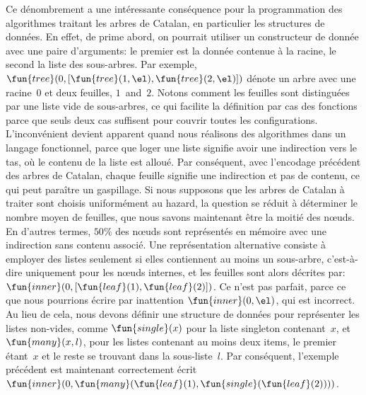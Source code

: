 Ce dénombrement a une intéressante conséquence pour la programmation
des algorithmes traitant les arbres de Catalan, en particulier les
structures de données. En effet, de prime abord, on pourrait utiliser
un constructeur de donnée  avec une paire d'arguments: le
premier est la donnée contenue à la racine, le second la liste des
sous-arbres. Par exemple, \(\fun{tree}(0,[\fun{tree}(1,\el),
  \fun{tree}(2,\el)])\) dénote un arbre avec une racine~\(0\) et deux
feuilles, \(1\)~and~\(2\). Notons comment les feuilles sont
distinguées par une liste vide de sous-arbres, ce qui facilite la
définition par cas des fonctions parce que seuls deux cas suffisent
pour couvrir toutes les configurations. L'inconvénient devient
apparent quand nous réalisons des algorithmes dans un langage
fonctionnel, parce que loger une liste signifie avoir une indirection
vers le tas, où le contenu de la liste est alloué. Par conséquent,
avec l'encodage précédent des arbres de Catalan, chaque feuille
signifie une indirection et pas de contenu, ce qui peut paraître un
gaspillage. Si nous supposons que les arbres de Catalan à traiter sont
choisis uniformément au hazard, la question se réduit à déterminer le
nombre moyen de feuilles, que nous savons maintenant être la moitié
des nœuds. En d'autres termes, \(50\%\) des nœuds sont représentés en
mémoire avec une indirection sans contenu associé. Une représentation
alternative consiste à employer des listes seulement si elles
contiennent au moins un sous-arbre, c'est-à-dire uniquement pour les
nœuds internes, et les feuilles sont alors décrites par:
\(\fun{inner}(0,[\fun{leaf}(1),\fun{leaf}(2)])\). Ce n'est pas
parfait, parce ce que nous pourrions écrire par inattention
\(\fun{inner}(0,\el)\), qui est incorrect. Au lieu de cela, nous
devons définir une structure de données pour représenter les listes
non-vides, comme \(\fun{single}(x)\) pour la liste singleton
contenant~\(x\), et \(\fun{many}(x,l)\), pour les listes contenant au
moins deux items, le premier étant~\(x\) et le reste se trouvant dans
la sous-liste~\(l\). Par conséquent, l'exemple précédent est
maintenant correctement écrit
\(\fun{inner}(0,\fun{many}(\fun{leaf}(1),\fun{single}(\fun{leaf}(2))))\).



